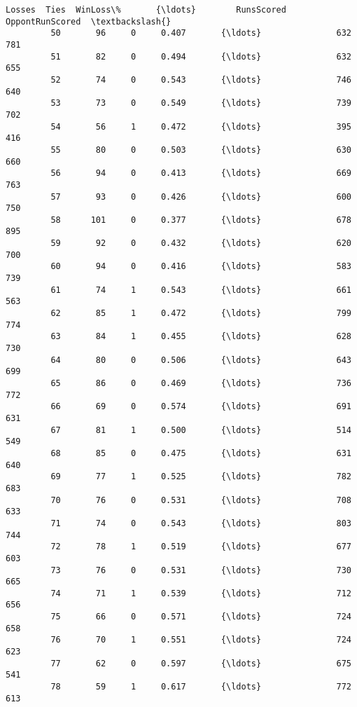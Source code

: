 \documentclass[11pt]{article}
\begin{document}
\begin{Verbatim}[commandchars=\\\{\}]
              Losses  Ties  WinLoss\%       {\ldots}        RunsScored OppontRunScored  \textbackslash{}
         50       96     0     0.407       {\ldots}               632             781   
         51       82     0     0.494       {\ldots}               632             655   
         52       74     0     0.543       {\ldots}               746             640   
         53       73     0     0.549       {\ldots}               739             702   
         54       56     1     0.472       {\ldots}               395             416   
         55       80     0     0.503       {\ldots}               630             660   
         56       94     0     0.413       {\ldots}               669             763   
         57       93     0     0.426       {\ldots}               600             750   
         58      101     0     0.377       {\ldots}               678             895   
         59       92     0     0.432       {\ldots}               620             700   
         60       94     0     0.416       {\ldots}               583             739   
         61       74     1     0.543       {\ldots}               661             563   
         62       85     1     0.472       {\ldots}               799             774   
         63       84     1     0.455       {\ldots}               628             730   
         64       80     0     0.506       {\ldots}               643             699   
         65       86     0     0.469       {\ldots}               736             772   
         66       69     0     0.574       {\ldots}               691             631   
         67       81     1     0.500       {\ldots}               514             549   
         68       85     0     0.475       {\ldots}               631             640   
         69       77     1     0.525       {\ldots}               782             683   
         70       76     0     0.531       {\ldots}               708             633   
         71       74     0     0.543       {\ldots}               803             744   
         72       78     1     0.519       {\ldots}               677             603   
         73       76     0     0.531       {\ldots}               730             665   
         74       71     1     0.539       {\ldots}               712             656   
         75       66     0     0.571       {\ldots}               724             658   
         76       70     1     0.551       {\ldots}               724             623   
         77       62     0     0.597       {\ldots}               675             541   
         78       59     1     0.617       {\ldots}               772             613   

\end{Verbatim}
\end{document}
